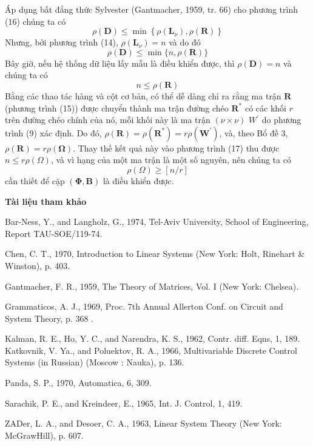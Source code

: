 \documentclass[12pt,a4paper]{article}
\begin{document}
Áp dụng bất đẳng thức Sylvester (Gantmacher, 1959, tr. 66) cho phương trình (16) chúng ta có
$$
\rho(\mathbf{D}) \leqslant \min \left\{\rho\left(\mathbf{L}_\nu\right), \rho(\mathbf{R})\right\}
$$
Nhưng, bởi phương trình (14), $\rho\left(\mathbf{L}_\nu\right)=n$ và do đó
$$
\rho(\mathbf{D}) \leqslant \min \{n, \rho(\mathbf{R})\}
$$
Bây giờ, nếu hệ thống dữ liệu lấy mẫu là điều khiển được, thì $\rho(\mathbf{D})=n$ và chúng ta có
\begin{equation}\tag{17}
	n \leqslant \rho(\mathbf{R})
\end{equation}
Bằng các thao tác hàng và cột cơ bản, có thể dễ dàng chỉ ra rằng ma trận $\mathbf{R}$ (phương trình (15)) được chuyển thành ma trận đường chéo $\mathbf{R}^*$ có các khối $r$ trên đường chéo chính của nó, mỗi khối này là ma trận $(\nu \times \nu)$ $W^{\prime}$ do phương trình (9) xác định. Do đó, $\rho(\mathbf{R})=\rho\left(\mathbf{R}^*\right)=r \rho\left(\mathbf{W}^{\prime}\right)$, và, theo Bổ đề 3, $\rho(\mathbf{R})=r \rho(\boldsymbol{\Omega})$. Thay thế kết quả này vào phương trình (17) thu được $n \leqslant r \rho(\Omega)$, và vì hạng của một ma trận là một số nguyên, nên chúng ta có
$$
\rho(\Omega) \geqslant[n / r]
$$
cần thiết để cặp $(\boldsymbol{\Phi}, \mathbf{B})$ là điều khiển được.

\begin{center}
	\textbf{Tài liệu tham khảo}
\end{center}

Bar-Ness, Y., and Langholz, G., 1974, Tel-Aviv University, School of Engineering, Report TAU-SOE/119-74.

Chen, C. T., 1970, Introduction to Linear Systems (New York: Holt, Rinehart \& Winston), p. 403.

Gantmacher, F. R., 1959, The Theory of Matrices, Vol. I (New York: Chelsea).

Grammaticos, A. J., 1969, Proc. 7th Annual Allerton Conf. on Circuit and System Theory, p. 368 .

Kalman, R. E., Ho, Y. C., and Narendra, K. S., 1962, Contr. diff. Eqns, 1, 189. Katkovnik, V. Ya., and Poluektov, R. A., 1966, Multivariable Discrete Control Systems (in Russian) (Moscow : Nauka), p. 136.

Panda, S. P., 1970, Automatica, 6, 309.

Sarachik, P. E., and Kreindeer, E., 1965, Int. J. Control, 1, 419.

ZADer, L. A., and Desoer, C. A., 1963, Linear System Theory (New York: McGrawHill), p. 607.
\end{document}
